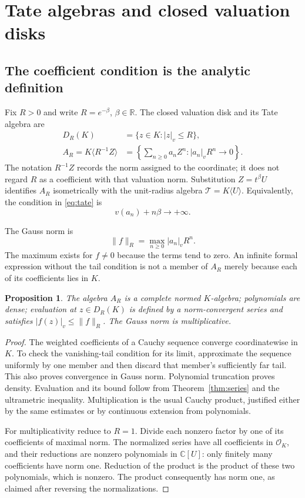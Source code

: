 \documentclass[11pt,a4paper]{article}
\numberwithin{equation}{section}
\newtheorem{proposition}[theorem]{Proposition}
\theoremstyle{definition}
\theoremstyle{remark}
\newcommand{\C}{\mathbb C}
\newcommand{\R}{\mathbb R}
\newcommand{\OO}{\mathcal O}
\newcommand{\TT}{\mathcal T}
\newcommand{\vabs}[1]{\lvert#1\rvert_v}
\newcommand{\Gauss}[2]{\lVert#1\rVert_{#2}}
\begin{document}
\section{Tate algebras and closed valuation disks}
\label{sec:tate}

\subsection{The coefficient condition is the analytic definition}
Fix $R>0$ and write $R=e^{-\beta}$, $\beta\in\R$. The closed valuation disk
and its Tate algebra are
\begin{align}
 D_R(K)&=\{z\in K:\vabs z\le R\},\label{eq:disk}\\
 A_R=K\langle R^{-1}Z\rangle
 &=\left\{\sum_{n\ge0}a_nZ^n:\vabs{a_n}R^n\longrightarrow0\right\}.
 \label{eq:tate}
\end{align}
The notation $R^{-1}Z$ records the norm assigned to the coordinate; it does not
regard $R$ as a coefficient with that valuation norm. Substitution $Z=t^\beta U$
identifies $A_R$ isometrically with the unit-radius algebra
$\TT=K\langle U\rangle$. Equivalently, the condition in \eqref{eq:tate} is
\begin{equation}\label{eq:tatevaluation}
 v(a_n)+n\beta\longrightarrow+\infty.
\end{equation}

The Gauss norm is
\[
 \Gauss fR=\max_{n\ge0}\vabs{a_n}R^n.
\]
The maximum exists for $f\ne0$ because the terms tend to zero. An infinite
formal expression without the tail condition is not a member of $A_R$ merely
because each of its coefficients lies in $K$.

\begin{proposition}\label{prop:banach}
The algebra $A_R$ is a complete normed $K$-algebra; polynomials are dense;
evaluation at $z\in D_R(K)$ is defined by a norm-convergent series and satisfies
$\vabs{f(z)}\le\Gauss fR$. The Gauss norm is multiplicative.
\end{proposition}
\begin{proof}
The weighted coefficients of a Cauchy sequence converge coordinatewise in $K$.
To check the vanishing-tail condition for its limit, approximate the sequence
uniformly by one member and then discard that member's sufficiently far tail.
This also proves convergence in Gauss norm. Polynomial truncation proves
density. Evaluation and its bound follow from Theorem~\ref{thm:series} and the
ultrametric inequality. Multiplication is the usual Cauchy product, justified
either by the same estimates or by continuous extension from polynomials.

For multiplicativity reduce to $R=1$. Divide each nonzero factor by one of its
coefficients of maximal norm. The normalized series have all coefficients in
$\OO_K$, and their reductions are nonzero polynomials in $\C[U]$: only finitely
many coefficients have norm one. Reduction of the product is the product of
these two polynomials, which is nonzero. The product consequently has norm one,
as claimed after reversing the normalizations.
\end{proof}
\end{document}
